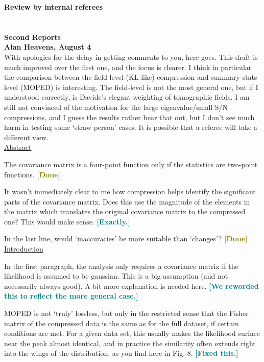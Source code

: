 \documentclass{article}
\newcommand\reply[1]{{\bf {\textcolor{teal}{[#1]}}}}
\newcommand\done{{\bf {\textcolor{olive}{[Done]}}}}
\begin{document}
    {\LARGE\textbf{Review by internal referees}}\\ \\ \\

    {\Large\textbf{Second Reports}}\\
    
    \textbf{Alan Heavens, August 4}\\

    With apologies for the delay in getting comments to you, here goes.  This draft is much improved over the first one, and the focus is clearer.  I think in particular the comparison between the field-level (KL-like) compression and summary-stats level (MOPED) is interesting.  The field-level is not the most general one, but if I understood correctly, is Davide’s elegant weighting of tomographic fields.  I am still not convinced of the motivation for the large eigenvalue/small S/N compressions, and I guess the results rather bear that out, but I don’t see much harm in testing some ‘straw person’ cases.  It is possible that a referee will take a different view.\\
 
    \underline{Abstract}
    
    The covariance matrix is a four-point function only if the statistics are two-point functions. \done

    It wasn’t immediately clear to me how compression helps identify the significant parts of the covariance matrix.  Does this use the magnitude of the elements in the matrix which translates the original covariance matrix to the compressed one?  This would make sense. \reply{Exactly.}

    In the last line, would ‘inaccuracies’ be more suitable than ‘changes’? \done\\

    \underline{Introduction}
    
    In the first paragraph, the analysis only requires a covariance matrix if the likelihood is assumed to be gaussian.  This is a big assumption (and not necessarily always good).  A bit more explanation is needed here. \reply{We reworded this to reflect the more general case.}

    MOPED is not ‘truly’ lossless, but only in the restricted sense that the Fisher matrix of the compressed data is the same as for the full dataset, if certain conditions are met.  For a given data set, this usually makes the likelihood surface near the peak almost identical, and in practice the similarity often extends right into the wings of the distribution, as you find here in Fig. 8. \reply{Fixed this.}
\end{document}
